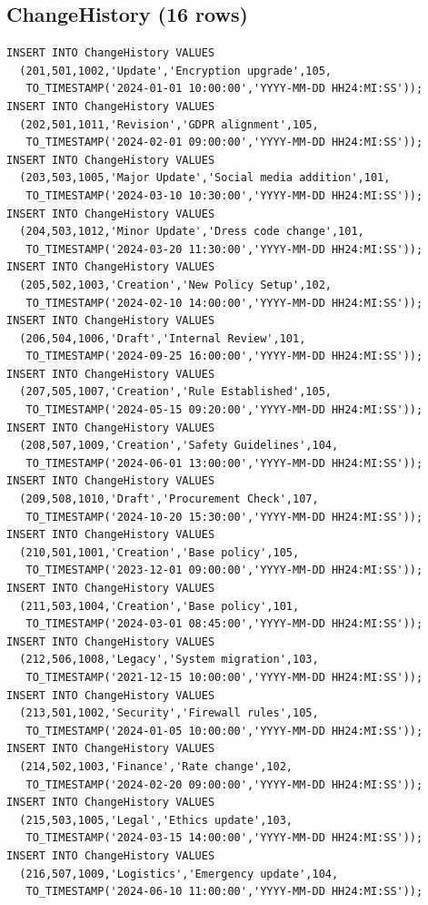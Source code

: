 \documentclass[conference]{IEEEtran}
\begin{document}
\subsection{ChangeHistory (16 rows)}
\begin{lstlisting}[style=sqlstyle, caption={DML: INSERT INTO ChangeHistory}]
INSERT INTO ChangeHistory VALUES
  (201,501,1002,'Update','Encryption upgrade',105,
   TO_TIMESTAMP('2024-01-01 10:00:00','YYYY-MM-DD HH24:MI:SS'));
INSERT INTO ChangeHistory VALUES
  (202,501,1011,'Revision','GDPR alignment',105,
   TO_TIMESTAMP('2024-02-01 09:00:00','YYYY-MM-DD HH24:MI:SS'));
INSERT INTO ChangeHistory VALUES
  (203,503,1005,'Major Update','Social media addition',101,
   TO_TIMESTAMP('2024-03-10 10:30:00','YYYY-MM-DD HH24:MI:SS'));
INSERT INTO ChangeHistory VALUES
  (204,503,1012,'Minor Update','Dress code change',101,
   TO_TIMESTAMP('2024-03-20 11:30:00','YYYY-MM-DD HH24:MI:SS'));
INSERT INTO ChangeHistory VALUES
  (205,502,1003,'Creation','New Policy Setup',102,
   TO_TIMESTAMP('2024-02-10 14:00:00','YYYY-MM-DD HH24:MI:SS'));
INSERT INTO ChangeHistory VALUES
  (206,504,1006,'Draft','Internal Review',101,
   TO_TIMESTAMP('2024-09-25 16:00:00','YYYY-MM-DD HH24:MI:SS'));
INSERT INTO ChangeHistory VALUES
  (207,505,1007,'Creation','Rule Established',105,
   TO_TIMESTAMP('2024-05-15 09:20:00','YYYY-MM-DD HH24:MI:SS'));
INSERT INTO ChangeHistory VALUES
  (208,507,1009,'Creation','Safety Guidelines',104,
   TO_TIMESTAMP('2024-06-01 13:00:00','YYYY-MM-DD HH24:MI:SS'));
INSERT INTO ChangeHistory VALUES
  (209,508,1010,'Draft','Procurement Check',107,
   TO_TIMESTAMP('2024-10-20 15:30:00','YYYY-MM-DD HH24:MI:SS'));
INSERT INTO ChangeHistory VALUES
  (210,501,1001,'Creation','Base policy',105,
   TO_TIMESTAMP('2023-12-01 09:00:00','YYYY-MM-DD HH24:MI:SS'));
INSERT INTO ChangeHistory VALUES
  (211,503,1004,'Creation','Base policy',101,
   TO_TIMESTAMP('2024-03-01 08:45:00','YYYY-MM-DD HH24:MI:SS'));
INSERT INTO ChangeHistory VALUES
  (212,506,1008,'Legacy','System migration',103,
   TO_TIMESTAMP('2021-12-15 10:00:00','YYYY-MM-DD HH24:MI:SS'));
INSERT INTO ChangeHistory VALUES
  (213,501,1002,'Security','Firewall rules',105,
   TO_TIMESTAMP('2024-01-05 10:00:00','YYYY-MM-DD HH24:MI:SS'));
INSERT INTO ChangeHistory VALUES
  (214,502,1003,'Finance','Rate change',102,
   TO_TIMESTAMP('2024-02-20 09:00:00','YYYY-MM-DD HH24:MI:SS'));
INSERT INTO ChangeHistory VALUES
  (215,503,1005,'Legal','Ethics update',103,
   TO_TIMESTAMP('2024-03-15 14:00:00','YYYY-MM-DD HH24:MI:SS'));
INSERT INTO ChangeHistory VALUES
  (216,507,1009,'Logistics','Emergency update',104,
   TO_TIMESTAMP('2024-06-10 11:00:00','YYYY-MM-DD HH24:MI:SS'));
\end{lstlisting}
\end{document}
